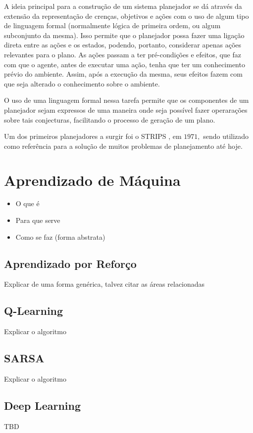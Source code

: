 A ideia principal para a construção de um sistema planejador se dá através da
extensão da representação de crenças, objetivos e ações com o uso de algum tipo
de linguagem formal (normalmente lógica de primeira ordem, ou algum subconjunto
da mesma). Isso permite que o planejador possa fazer uma ligação direta entre
as ações e os estados, podendo, portanto, considerar apenas ações relevantes
para o plano. \cite{Russell:1995:AIM:193191} As ações passam a ter
pré-condições e efeitos, que faz com que o agente, antes de executar uma ação,
tenha que ter um conhecimento prévio do ambiente. Assim, após a execução da
mesma, seus efeitos fazem com que seja alterado o conhecimento sobre o
ambiente.

O uso de uma linguagem formal nessa tarefa permite que os componentes de um
planejador sejam expressos de uma maneira onde seja possível fazer operarações
sobre tais conjecturas, facilitando o processo de geração de um plano.

Um dos primeiros planejadores a surgir foi o STRIPS \cite{STRIPSNEWAPPROACH},
em $1971,$ sendo utilizado como referência para a solução de muitos problemas de
planejamento até hoje.

\section{Aprendizado de Máquina}

\begin{itemize} \item O que é \item Para que serve \item Como se faz (forma
abstrata) \end{itemize}

\subsection{Aprendizado por Reforço}

Explicar de uma forma genérica, talvez citar as áreas relacionadas

\subsection{Q-Learning}

Explicar o algoritmo

\subsection{SARSA}

Explicar o algoritmo

\subsection{Deep Learning}

TBD
